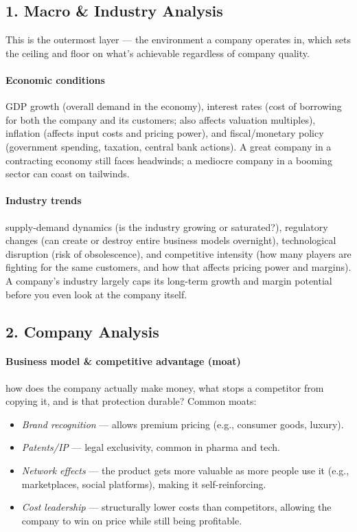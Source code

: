 \documentclass[12pt,openany]{book}
\begin{document}
\subsection{1. Macro \& Industry Analysis}

This is the outermost layer --- the environment a company operates in, which sets the ceiling and floor on what's achievable regardless of company quality.

\paragraph{Economic conditions} GDP growth (overall demand in the economy), interest rates (cost of borrowing for both the company and its customers; also affects valuation multiples), inflation (affects input costs and pricing power), and fiscal/monetary policy (government spending, taxation, central bank actions). A great company in a contracting economy still faces headwinds; a mediocre company in a booming sector can coast on tailwinds.

\paragraph{Industry trends} supply-demand dynamics (is the industry growing or saturated?), regulatory changes (can create or destroy entire business models overnight), technological disruption (risk of obsolescence), and competitive intensity (how many players are fighting for the same customers, and how that affects pricing power and margins). A company's industry largely caps its long-term growth and margin potential before you even look at the company itself.

\subsection{2. Company Analysis}

\paragraph{Business model \& competitive advantage (moat)} how does the company actually make money, what stops a competitor from copying it, and is that protection durable? Common moats:

\begin{itemize}[leftmargin=*]
    \item \emph{Brand recognition} --- allows premium pricing (e.g., consumer goods, luxury).
    \item \emph{Patents/IP} --- legal exclusivity, common in pharma and tech.
    \item \emph{Network effects} --- the product gets more valuable as more people use it (e.g., marketplaces, social platforms), making it self-reinforcing.
    \item \emph{Cost leadership} --- structurally lower costs than competitors, allowing the company to win on price while still being profitable.
\end{itemize}
\end{document}
